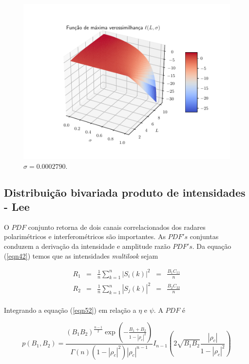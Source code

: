\documentclass[journal,article,submit,moreauthors,pdftex]{Definitions/mdpi}
\begin{document}
\begin{figure}[hbt]
  	\caption{$\sigma= 0.0004329$.}\label{cap_acf_fig04}
\endminipage\hfill
{}
  \includegraphics[width=\linewidth]{funv_max_ver_j_80_flev_produto.pdf}
		\caption{$\sigma= 0.0002790$.}\label{cap_acf_fig05}
\endminipage\hfill
\end{figure}


\subsection{Distribuição bivariada produto de intensidades - Lee } 

O $PDF$ conjunto retorna de dois canais correlacionados dos radares polarimétricos e interferométricos são importantes. As $PDF's$ conjuntas conduzem a derivação da intensidade e amplitude razão $PDF's$. Da equação (\ref{eqn42}) temos que as intensidades {\it multilook} sejam 

\begin{equation}\label{eqn59}
\begin{array}{ccccc}
	R_1&=&\frac{1}{n}\sum_{k=1}^{n}|S_i(k)|^2&=&\frac{B_1C_{11}}{n}\\
	R_2&=&\frac{1}{n}\sum_{k=1}^{n}|S_j(k)|^2&=&\frac{B_2C_{22}}{n}\\
\end{array}
\end{equation}

Integrando a equação (\ref{eqn52}) em relação a $\eta$ e $\psi$. A $PDF$ é

\begin{equation}\label{eqn60}
	p(B_1,B_2)=\frac{\left(B_1B_2\right)^{\frac{n-1}{2}}\exp\left(-\frac{B_1+B_2}{1-|\rho_c|^2}\right)}{\Gamma(n)(1-|\rho_c|^2)|\rho_c|^{n-1}}I_{n-1}\left(2\sqrt{B_1B_2}\frac{|\rho_c|}{1-|\rho_c|^2}\right)
\end{equation}
\end{document}
